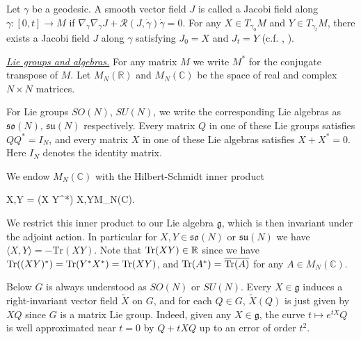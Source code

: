 \documentclass[11pt,UTF-8,reqno]{amsart}
\numberwithin{equation}{section}
\def\Re{{\mathrm{Re}}}
\def\u{\mathbf{u}}
\def\<{{\langle}}
\def\>{{\rangle}}
\def\tr{\mathrm {tr}}
\def\sR{{\mathscr R}}
\def\Tr{\mathrm{Tr}}
\def\Re{{\mathrm{Re}}}
\def\u{\mathbf{u}}
\def\<{{\langle}}
\def\>{{\rangle}}
\def\tr{\mathrm {tr}}
\def\tr{{\rm Tr}}
\def\so{\mathfrak{so}}
\def\su{\mathfrak{su}}
\def\u{\mathfrak{u}}
\def\mfg{\mathfrak{g}}
\def\R{\mathbb R}
\def\C{\mathbb C}
\def\<{\langle} \def\>{\rangle}
\begin{document}
Let $\gamma$ be a geodesic. A smooth vector field $J$ is called a Jacobi field along $\gamma:[0,t]\to M$ if $\nabla_{\dot\gamma}\nabla_{\dot\gamma}J+\sR(J,\dot\gamma)\dot\gamma=0$. For any $X\in T_{\gamma_0}M$ and $Y\in T_{\gamma_t}M$, there exists a Jacobi field $J$ along $\gamma$ satisfying $J_0=X$ and $J_t=Y$ (c.f. \cite[Section 1.5]{CE75}, \cite[Section 0.4]{Wang} ).





\medskip

\underline{\it Lie groups and algebras.}
For any matrix $M$ we write $M^*$ for the conjugate transpose of $M$.
Let $M_N(\R)$ and $M_N(\C)$ be the space of real and complex $N\times N$ matrices.

For Lie groups $SO(N)$, $SU(N)$,
we write the corresponding Lie algebras
as $\so(N)$, $\su(N)$ respectively.
Every matrix $Q$ in one of these Lie groups satisfies $QQ^* = I_N$, and every matrix $X$ in one of these Lie algebras
satisfies $X + X^* = 0$.
Here $I_N$ denotes the identity matrix.

We endow $M_N(\C)$ with the Hilbert-Schmidt inner product
\begin{equ}[e:HS]
	\< X,Y\> = \Re \Tr (X Y^*)
	\qquad  \forall X,Y\in M_N(\C).
\end{equ}
We restrict this inner product to our
Lie algebra $\mfg$, which is then invariant under the adjoint action.
In particular for $X,Y\in \so(N)$ or $\su(N)$ we have
$\< X,Y\> =- \Tr (XY)$. 
Note that $\tr(XY) \in \R$ since 
we have $\tr ((XY)^*) = \tr(Y^* X^*) = \tr(XY)$,
and $\tr(A^*)= \overline{\tr(A)}$  for any $A\in M_N(\C)$.


Below $G$ is always understood as $SO(N)$ or $SU(N)$.
Every $X\in \mfg$ induces a right-invariant vector field  $\widetilde X$
on $G$, and for each $Q\in G$, $\widetilde X(Q)$  is just given by $XQ$ since $G$ is a matrix Lie group. Indeed, given any $X \in \mfg$, the curve $t \mapsto e^{tX} Q$ is well approximated near $t=0$ by $Q+tXQ$ up to an error of order $t^{2}$.
\end{document}

